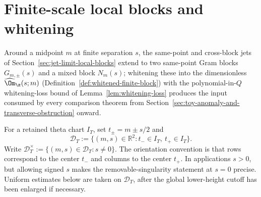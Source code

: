 %

\section{Finite-scale local blocks and whitening}
\label{sec:finite-scale-local-blocks-and-whitening}
\quad
{}\quad
{}\quad
{}\quad
{}\quad
{}
\par\medskip

Around a midpoint \(m\) at finite separation \(s\), the same-point and
cross-block jets of Section~\ref{sec:jet-limit-local-blocks} extend to
two same-point Gram blocks \(G_{m,\pm}(s)\) and a mixed block
\(N_m(s)\); whitening these into the dimensionless
\(\widehat\Om_\z(s;m)\)
(Definition~\ref{def:whitened-finite-block}) with the
polynomial-in-\(Q\) whitening-loss bound of
Lemma~\ref{lem:whitening-loss} produces the input consumed by every
comparison theorem from
Section~\ref{sec:toy-anomaly-and-transverse-obstruction} onward.

\begin{definition}
\label{def:finite-packet-domain}
For a retained theta chart \(I_T\), set \(t_\pm = m\pm s/2\) and
\[
        \mathcal D_T
        :=\bigl\{(m,s)\in\mathbb R^2 : t_-\in I_T,\ t_+\in I_T\bigr\}.
\]
Write \(\mathcal D_T^\times := \{(m,s)\in\mathcal D_T : s\ne 0\}\).
The orientation convention is that rows correspond to the center
\(t_-\) and columns to the center \(t_+\).  In applications \(s>0\),
but allowing signed \(s\) makes the removable-singularity statement at
\(s=0\) precise.  Uniform estimates below are taken on
\(\mathcal D_T\), after the global lower-height cutoff has been
enlarged if necessary.
\end{definition}

